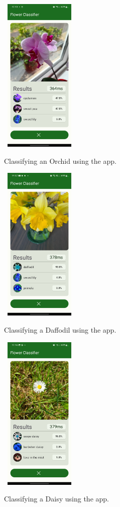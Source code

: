 \documentclass{article}
\begin{document}
\begin{figure}[h]\
    \includegraphics[width=0.3\textwidth]{cyclamen.jpg}
    \caption{Classifying an Orchid using the app.}
    \label{fig:cyclamen}
\end{figure}

\begin{figure}[h]\
    \includegraphics[width=0.3\textwidth]{daffodil.jpg}
    \caption{Classifying a Daffodil using the app.}
    \label{fig:daffodil}
\end{figure}

\begin{figure}[h]\
    \includegraphics[width=0.3\textwidth]{daisy.jpg}
    \caption{Classifying a Daisy using the app.}
    \label{fig:daisy}
\end{figure}
\end{document}
